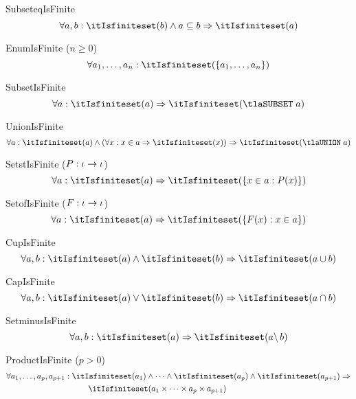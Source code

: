 \documentclass[11pt, a4paper, oneside]{article}
\begin{document}
\begin{axioms}
\item[SubseteqIsFinite] \[
        \forall a, b : \itIsfiniteset(b) \wedge a \subseteq b \imp \itIsfiniteset(a)
    \]

\item[EnumIsFinite ($n \ge 0$)] \[
        \forall a_1, \dots, a_n : \itIsfiniteset(\st{ a_1, \dots, a_n })
    \]

\item[SubsetIsFinite] \[
        \forall a : \itIsfiniteset(a) \imp \itIsfiniteset(\tlaSUBSET\; a)
    \]

\item[UnionIsFinite] \[
        \forall a : \itIsfiniteset(a) \wedge (\forall x : x \in a \imp \itIsfiniteset(x)) \imp \itIsfiniteset(\tlaUNION\; a)
    \]

\item[SetstIsFinite ($P : \iota \rightarrow \iota$)] \[
        \forall a : \itIsfiniteset(a) \imp \itIsfiniteset(\st{ x \in a : P(x) })
    \]

\item[SetofIsFinite ($F : \iota \rightarrow \iota$)] \[
        \forall a : \itIsfiniteset(a) \imp \itIsfiniteset(\st{ F(x) : x \in a })
    \]

\item[CupIsFinite] \[
        \forall a, b : \itIsfiniteset(a) \wedge \itIsfiniteset(b) \imp \itIsfiniteset(a \cup b)
    \]

\item[CapIsFinite] \[
        \forall a, b : \itIsfiniteset(a) \vee \itIsfiniteset(b) \imp \itIsfiniteset(a \cap b)
    \]

\item[SetminusIsFinite] \[
        \forall a, b : \itIsfiniteset(a) \imp \itIsfiniteset(a \backslash\, b)
    \]


\item[ProductIsFinite ($p > 0$)] \[
        \begin{aligned}
            \forall a_1, \dots, a_p, a_{p + 1} :\; &\itIsfiniteset(a_1) \wedge \dots \wedge \itIsfiniteset(a_p) \wedge \itIsfiniteset(a_{p + 1}) \imp \\
            &\qquad \itIsfiniteset(a_1 \times \cdots \times a_p \times a_{p + 1})
        \end{aligned}
    \]


\end{axioms}
\end{document}
